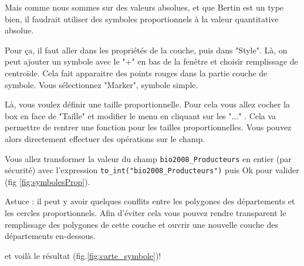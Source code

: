\documentclass[a4paper, 11pt]{article}
\begin{document}
  Mais comme nous sommes sur des valeurs absolues, et que Bertin est un type bien, il faudrait utiliser des symboles proportionnels à la valeur quantitative absolue.

  Pour ça, il faut aller dans les propriétés de la couche, puis dans "Style". Là, on peut ajouter un symbole avec le "+" en bas de la fenêtre et choisir remplissage de centroïde. Cela fait apparaitre des points rouges dans la partie couche de symbole. Vous sélectionnez "Marker", symbole simple.

  Là, vous voulez définir une taille proportionnelle. Pour cela vous allez cocher la box en face de "Taille" et modifier le menu en cliquant sur les "..." . Cela va permettre de rentrer une fonction pour les tailles proportionnelles. Vous pouvez alors directement effectuer des opérations sur le champ.

  Vous allez transformer la valeur du champ \texttt{bio2008\_Producteurs} en entier (par sécurité) avec l'expression \texttt{to\_int("bio2008\_Producteurs")}
  puis Ok pour valider (fig \ref{fig:symbolesProp}).

  Astuce : il peut y avoir quelques conflits entre les polygones des départements et les cercles proportionnels. Afin d'éviter cela vous pouvez rendre transparent le remplissage des polygones de cette couche et ouvrir une nouvelle couche des départements en-dessous.

  et voilà le résultat (fig.\ref{fig:carte_symbole})!
\end{document}
